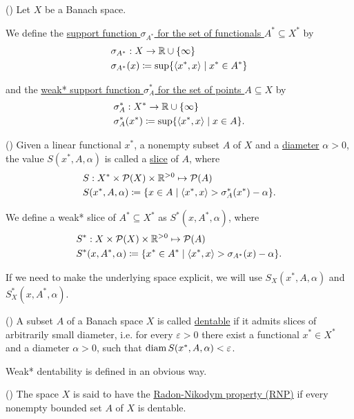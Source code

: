 \begin{definition}(\cite[39]{Phelps1993})
  \label{def:analysis:asplund:support-function}
  Let $X$ be a Banach space.

  We define the \uline{support function $\sigma_{A^*}$ for the set of functionals $A^* \subseteq X^*$} by
  \begin{align*}
    &\sigma_{A^*}: X \to \mathbb{R} \cup \{ \infty \} \\
    &\sigma_{A^*}(x) \coloneqq \sup \{ \left\langle x^*, x \right\rangle \mid x^* \in A^* \}
  \end{align*}

  and the \uline{weak* support function $\sigma^*_A$ for the set of points $A \subseteq X$} by
  \begin{align*}
    &\sigma^*_A: X^* \to \mathbb{R} \cup \{ \infty \} \\
    &\sigma^*_A(x^*) \coloneqq \sup \{ \left\langle x^*, x \right\rangle \mid x \in A \}.
  \end{align*}
\end{definition}

\begin{definition}(\cite[24]{Phelps1993})
  \label{def:analysis:asplund:slice}
  Given a linear functional $x^*$, a nonempty subset $A$ of $X$ and a \uline{diameter} $\alpha > 0$, the value $S(x^*, A, \alpha)$ is called a \uline{slice} of $A$, where
  \begin{align*}
    &S: X^* \times \mathcal{P}(X) \times \mathbb{R}^{>0} \mapsto \mathcal{P}(A) \\
    &S(x^*, A, \alpha) \coloneqq \{ x \in A \mid \left\langle x^*, x \right\rangle > \sigma_A^*(x^*) - \alpha \}.
  \end{align*}

  We define a weak* slice of $A^* \subseteq X^*$ as $S^*(x, A^*, \alpha)$, where
  \begin{align*}
    &S^*: X \times \mathcal{P}(X) \times \mathbb{R}^{>0} \mapsto \mathcal{P}(A) \\
    &S^*(x, A^*, \alpha) \coloneqq \{ x^* \in A^* \mid \left\langle x^*, x \right\rangle > \sigma_{A^*}(x) - \alpha \}.
  \end{align*}

  If we need to make the underlying space explicit, we will use $S_X(x^*, A, \alpha)$ and $S_X^*(x, A^*, \alpha)$.
\end{definition}

\begin{definition}(\cite[79]{Phelps1993})
  \label{def:analysis:asplund:dentability}
  A subset $A$ of a Banach space $X$ is called \uline{dentable} if it admits slices of arbitrarily small diameter, i.e. for every $\varepsilon > 0$ there exist a functional $x^* \in X^*$ and a diameter $\alpha > 0$, such that $\operatorname{diam} S(x^*, A, \alpha) < \varepsilon$.

  Weak* dentability is defined in an obvious way.
\end{definition}

\begin{definition}(\cite[80]{Phelps1993})
  \label{def:analysis:asplund:rnp}
  The space $X$ is said to have the \uline{Radon-Nikodym property (RNP)} if every nonempty bounded set $A$ of $X$ is dentable.
\end{definition}
